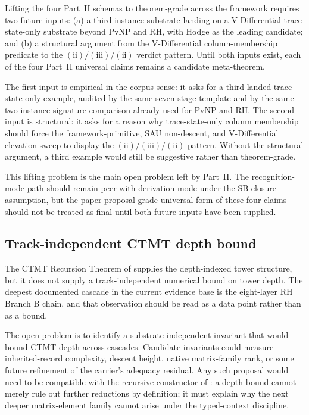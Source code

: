 \documentclass[11pt]{article}
\newcommand{\SigPattern}{$\mathrm{(ii)}/\mathrm{(iii)}/\mathrm{(ii)}$}
\theoremstyle{definition}
\begin{document}
Lifting the four Part~II schemas to theorem-grade across the framework
requires two future inputs: (a) a third-instance substrate landing on
a V-Differential trace-state-only substrate beyond PvNP and RH, with
Hodge as the leading candidate; and (b) a structural argument from
the V-Differential column-membership predicate to the \SigPattern{}
verdict pattern.  Until both inputs exist, each of the
four Part~II universal claims remains a candidate meta-theorem.

The first input is empirical in the corpus sense: it asks for a third
landed trace-state-only example, audited by the same seven-stage
template and by the same two-instance signature comparison already
used for PvNP and RH.  The second input is structural: it asks for a
reason why trace-state-only column membership should force the
framework-primitive, SAU non-descent, and V-Differential elevation
sweep to display the \SigPattern{} pattern.  Without the structural
argument, a third example would still be suggestive rather than
theorem-grade.

This lifting problem is the main open problem left by Part~II.  The
recognition-mode path should remain peer with derivation-mode under
the SB closure assumption, but the paper-proposal-grade universal
form of these four claims should not be treated as final until both
future inputs have been supplied.

\subsection{Track-independent CTMT depth bound}
\label{sec:predictions:ctmt-depth-bound}

The CTMT Recursion Theorem of  supplies the
depth-indexed tower structure, but it does not supply a
track-independent numerical bound on tower depth.  The deepest
documented cascade in the current evidence base is the eight-layer RH
Branch B chain, and that observation should be read as a data point
rather than as a bound.

The open problem is to identify a substrate-independent invariant
that would bound CTMT depth across cascades.  Candidate invariants
could measure inherited-record complexity, descent height, native
matrix-family rank, or some future refinement of the carrier's
adequacy residual.  Any such proposal would need to be compatible with
the recursive constructor of : a depth bound
cannot merely rule out further reductions by definition; it must
explain why the next deeper matrix-element family cannot arise under
the typed-context discipline.
\end{document}
